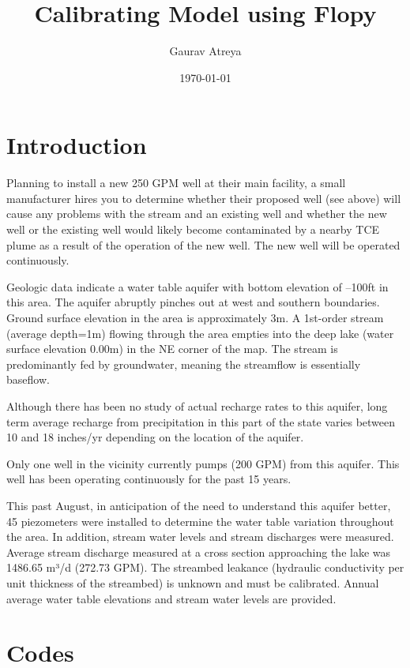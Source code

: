 \documentclass[titlepage,12pt]{unisubmission}
\author{Gaurav Atreya}
\date{\today}
\title{Calibrating Model using Flopy}
\begin{document}
\maketitle
\setcounter{tocdepth}{2}
\tableofcontents

\section{Introduction}
\label{sec:org174b30a}

Planning to install a new 250 GPM well at their main facility, a small manufacturer hires you to determine whether their proposed well (see above) will cause any problems with the stream and an existing well and whether the new well or the existing well would likely become contaminated by a nearby TCE plume as a result of the operation of the new well. The new well will be operated continuously.

Geologic data indicate a water table aquifer with bottom elevation of –100ft in this area. The aquifer abruptly pinches out at west and southern boundaries. Ground surface elevation in the area is approximately 3m. A 1st-order stream (average depth=1m) flowing through the area empties into the deep lake (water surface elevation 0.00m) in the NE corner of the map. The stream is predominantly fed by groundwater, meaning the streamflow is essentially baseflow.

Although there has been no study of actual recharge rates to this aquifer, long term average recharge from precipitation in this part of the state varies between 10 and 18 inches/yr depending on the location of the aquifer.

Only one well in the vicinity currently pumps (200 GPM) from this aquifer. This well has been operating continuously for the past 15 years.

This past August, in anticipation of the need to understand this aquifer better, 45 piezometers were installed to determine the water table variation throughout the area. In addition, stream water levels and stream discharges were measured. Average stream discharge measured at a cross section approaching the lake was 1486.65 m³/d (272.73 GPM). The streambed leakance (hydraulic conductivity per unit thickness of the streambed) is unknown and must be calibrated. Annual average water table elevations and stream water levels are provided.

\section{Codes}
\label{sec:org8ad3ae6}
\end{document}
